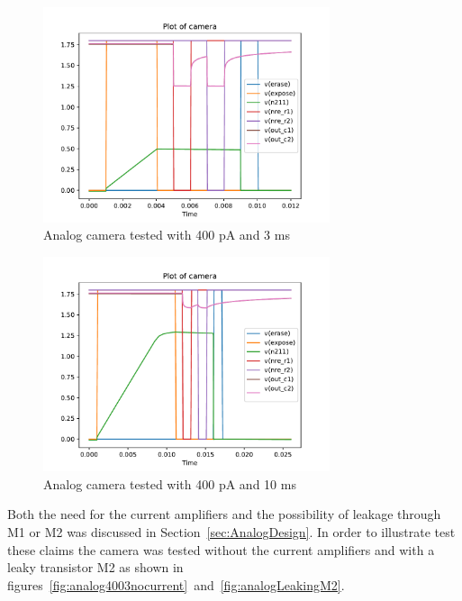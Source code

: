\begin{figure}[htbp]
  \centering
  \includegraphics[width=0.75\textwidth]{../analog/camera4003typical}
  \caption{Analog camera tested with 400 pA and 3 ms}
  \label{fig:analog4003}
\end{figure}

\begin{figure}[htbp]
  \centering
  \includegraphics[width=0.75\textwidth]{../analog/camera40010overexposed}
  \caption{Analog camera tested with 400 pA and 10 ms}
  \label{fig:analog40010}
\end{figure}


Both the need for the current amplifiers and the possibility of leakage through M1 or M2 was discussed in Section~\ref{sec:AnalogDesign}.
In order to illustrate test these claims the camera was tested without the current amplifiers and with a leaky transistor M2 as shown in figures~\ref{fig:analog4003nocurrent}~and~\ref{fig:analogLeakingM2}.

